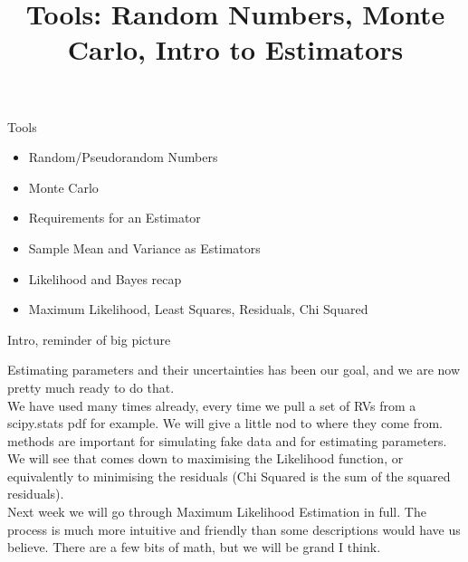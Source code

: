 \documentclass[10pt,sans,english,compress,xcolor=dvipsnames]{beamer}
\title[Tools]{Tools: Random Numbers, Monte Carlo, Intro to Estimators}
\date{}
\begin{document}



\begin{frame}
\titlepage
\end{frame} 





\begin{frame}{Tools}
\begin{itemize}
\item Random/Pseudorandom Numbers
\item Monte Carlo
\item Requirements for an Estimator
\item Sample Mean and Variance as Estimators
\item Likelihood and Bayes recap
\item Maximum Likelihood, Least Squares, Residuals, Chi Squared
\end{itemize}

\end{frame} 


\begin{frame}{Intro, reminder of big picture}

\footnotesize

Estimating parameters and their uncertainties has been our goal, and we are now pretty much ready to do that.\\[1ex]
We have used  many times already, every time we pull a set of RVs from a scipy.stats pdf for example. We will give a little nod to where they come from.\\[1ex]
 methods are important for simulating fake data and for estimating parameters.\\[1ex]
We will see that  comes down to maximising the Likelihood function, or equivalently to minimising the residuals (Chi Squared is the sum of the squared residuals).\\[1ex]
Next week we will go through Maximum Likelihood Estimation in full. The process is much more intuitive and friendly than some descriptions would have us believe. There are a few bits of math, but we will be grand I think.

\end{frame} 
\end{document}
